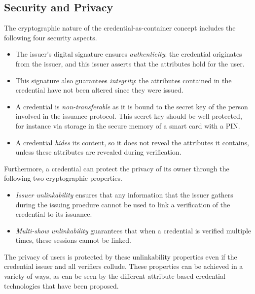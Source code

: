 \subsection{Security and Privacy}

The cryptographic nature of the credential-as-container concept includes the
following four security aspects.
\begin{itemize}
  \item The issuer's digital signature ensures \emph{authenticity}:
     the credential originates from the issuer, and this
    issuer asserts that the attributes hold for the user.
  \item This signature also guarantees \emph{integrity}:  the
    attributes contained in the credential have not been altered since they were
    issued.
  \item A credential is \emph{non-transferable} as
    it is bound to the secret key of the person involved in the issuance
    protocol. This secret key should be well protected, for instance via storage
    in the secure memory of a smart card with a PIN.
  \item A credential \emph{hides} its content, so it does not
    reveal the attributes it contains, unless these attributes are revealed
    during verification.
\end{itemize}
Furthermore, a credential can protect the privacy of its owner
through the following two cryptographic properties.
\begin{itemize}
  \item \emph{Issuer unlinkability}
     ensures that any
    information that the issuer gathers during the issuing proedure cannot be 
    used to link a verification of the credential to its issuance.
  \item \emph{Multi-show unlinkability}
     guarantees
    that when a credential is verified multiple times, these sessions cannot be
    linked.
\end{itemize}
The privacy of users is protected by these unlinkability properties even if the
credential issuer and all verifiers collude. These properties can
be achieved in a variety of ways, as can be seen by the different
attribute-based credential technologies that have been proposed.


